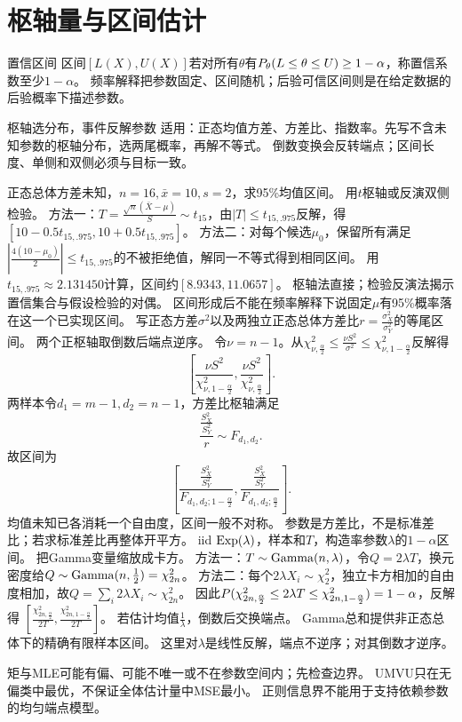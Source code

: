 \section{枢轴量与区间估计}\label{sec:75}
\begin{definition}{置信区间}
区间$[L(X),U(X)]$若对所有$\theta$有$P_\theta(L\le\theta\le U)\ge1-\alpha$，称置信系数至少$1-\alpha$。
频率解释把参数固定、区间随机；后验可信区间则是在给定数据的后验概率下描述参数。
\end{definition}
\begin{method}{枢轴选分布，事件反解参数}
适用：正态均值方差、方差比、指数率。先写不含未知参数的枢轴分布，选两尾概率，再解不等式。
倒数变换会反转端点；区间长度、单侧和双侧必须与目标一致。
\end{method}
{正态总体方差未知，$n=16,\bar x=10,s=2$，求95\%均值区间。}
{用$t$枢轴或反演双侧检验。}
{方法一：$T=\frac{\sqrt n(\bar X-\mu)}{S}\sim t_{15}$，由$|T|\le t_{15,.975}$反解，得$[10-0.5t_{15,.975},10+0.5t_{15,.975}]$。
方法二：对每个候选$\mu_0$，保留所有满足$|\frac{4(10-\mu_0)}{2}|\le t_{15,.975}$的不被拒绝值，解同一不等式得到相同区间。
用$t_{15,.975}\approx2.131450$计算，区间约$[8.9343,11.0657]$。}
{枢轴法直接；检验反演法揭示置信集合与假设检验的对偶。}
{区间形成后不能在频率解释下说固定$\mu$有95\%概率落在这一个已实现区间。}
{写正态方差$\sigma^2$以及两独立正态总体方差比$r=\frac{\sigma_X^2}{\sigma_Y^2}$的等尾区间。}
{两个正枢轴取倒数后端点逆序。}
{令$\nu=n-1$。从$\chi^2_{\nu,\frac{\alpha}{2}}\le\frac{\nu S^2}{\sigma^2}\le\chi^2_{\nu,1-\frac{\alpha}{2}}$反解得
\[\left[\dfrac{\nu S^2}{\chi^2_{\nu,1-\frac{\alpha}{2}}},\dfrac{\nu S^2}{\chi^2_{\nu,\frac{\alpha}{2}}}\right].\]
两样本令$d_1=m-1,d_2=n-1$，方差比枢轴满足
\[\dfrac{\frac{S_X^2}{S_Y^2}}{r}\sim F_{d_1,d_2}.\]
故区间为
\[\left[\dfrac{\frac{S_X^2}{S_Y^2}}{F_{d_1,d_2;1-\frac{\alpha}{2}}},\dfrac{\frac{S_X^2}{S_Y^2}}{F_{d_1,d_2;\frac{\alpha}{2}}}\right].\]}
{均值未知已各消耗一个自由度，区间一般不对称。}
{参数是方差比，不是标准差比；若求标准差比再整体开平方。}
{iid $\operatorname{Exp}(\lambda)$，样本和$T$，构造率参数$\lambda$的$1-\alpha$区间。}
{把Gamma变量缩放成卡方。}
{方法一：$T\sim\operatorname{Gamma}(n,\lambda)$，令$Q=2\lambda T$，换元密度给$Q\sim\operatorname{Gamma}(n,\frac{1}{2})=\chi_{2n}^2$。
方法二：每个$2\lambda X_i\sim\chi_2^2$，独立卡方相加的自由度相加，故$Q=\sum_i2\lambda X_i\sim\chi_{2n}^2$。
因此$P(\chi^2_{2n,\frac{\alpha}{2}}\le2\lambda T\le\chi^2_{2n,1-\frac{\alpha}{2}})=1-\alpha$，反解得
$[\frac{\chi^2_{2n,\frac{\alpha}{2}}}{2T},\frac{\chi^2_{2n,1-\frac{\alpha}{2}}}{2T}]$。
若估计均值$\frac{1}{\lambda}$，倒数后交换端点。}
{Gamma总和提供非正态总体下的精确有限样本区间。}
{这里对$\lambda$是线性反解，端点不逆序；对其倒数才逆序。}
\begin{warning}
矩与MLE可能有偏、可能不唯一或不在参数空间内；先检查边界。
UMVU只在无偏类中最优，不保证全体估计量中MSE最小。
正则信息界不能用于支持依赖参数的均匀端点模型。
\end{warning}

